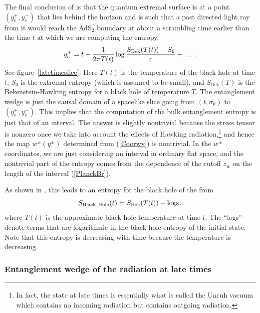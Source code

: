 \documentclass[11pt]{article}
\newcommand{\be}{\begin{equation}}
\newcommand{\ee}{\end{equation}}
\def\la{\label}
\def\nref#1{(\ref{#1})}
\begin{document}
The final conclusion of \cite{Penington:2019npb,Almheiri:2019psf} is that the quantum extremal surface is at a point $(y^+_e,y^-_e)$ that lies behind the horizon and is such that a past directed light ray from it would reach the AdS$_2$ boundary at about a scrambling time earlier than the time $t$ at which we are computing the entropy,
\begin{align}
y_e^+ = t - {1 \over 2 \pi T(t)} \log {S_{\text{Bek}}(T(t)) - S_0 \over c} + \ldots\, .
\end{align}
See figure~\ref{latetimeslice}.
Here $T(t)$ is the temperature of the black hole at time $t$, $S_0$ is the extremal entropy (which is assumed to be small), and $S_{\text{Bek}}(T)$ is the Bekenstein-Hawking entropy for a black hole of temperature $T$.
The entanglement wedge is just the causal domain of a spacelike slice going from $(t,\sigma_0)$ to $(y^+_e, y^-_e)$. 
This implies that the computation of the bulk entanglement entropy is just that of an interval.
The answer is slightly nontrivial because the stress tensor is nonzero once we take into account the effects of Hawking radiation,\footnote{In fact, the state at late times is essentially what is called the Unruh vacuum which contains no incoming radiation but contains outgoing radiation.} and hence the map $w^\pm(y^\pm)$ determined from (\ref{Coorwy}) is nontrivial. 
In the $w^\pm$ coordinates, we are just considering an interval in ordinary flat space, and the nontrivial part of the entropy comes from the dependence of the cutoff $z_w$ on the length of the interval \nref{PlanckBr}.


As shown in \cite{Penington:2019npb,Almheiri:2019psf}, 
this leads to an entropy for the black hole of the from 
\be \la{Ent}
   S_{\rm Black~ Hole} (t) = S_{\text{Bek}} (T(t) ) + {\rm logs } \, ,
\ee
where $T(t)$ is the approximate black hole temperature at time $t$.
The ``logs'' denote terms that are logarithmic in the black hole entropy of the initial state.
Note that this entropy is decreasing with time because the temperature is decreasing. 

\subsubsection{Entanglement wedge of the radiation at late times} 
  
\end{document}
